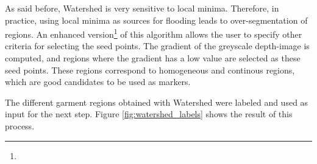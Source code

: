 As said before, Watershed is very sensitive to local minima. Therefore, in practice, using local minima as sources for flooding leads to over-segmentation of regions. An enhanced version\footnote{} of this algorithm allows the user to specify other criteria for selecting the seed points. The gradient of the greyscale depth-image is computed, and regions where the gradient has a low value are selected as these seed points. These regions correspond to homogeneous and continous regions, which are good candidates to be used as markers.


The different garment regions obtained with Watershed were labeled and used as input for the next step. Figure \ref{fig:watershed_labels} shows the result of this process.


